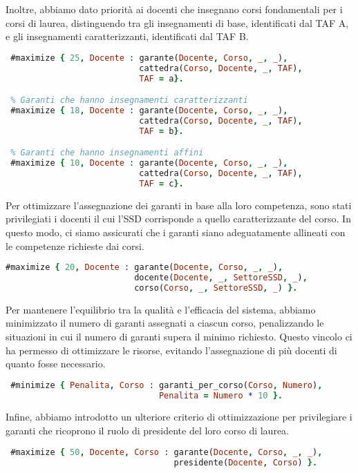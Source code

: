 Inoltre, abbiamo dato priorità ai docenti che insegnano corsi fondamentali per i 
corsi di laurea, distinguendo tra gli insegnamenti di base, identificati dal TAF A, 
e gli insegnamenti caratterizzanti, identificati dal TAF B.

\begin{lstlisting}[language=prolog, caption=Gestione delle priorità del TAF.]
 % Garanti che hanno insegnamenti di base
 #maximize { 25, Docente : garante(Docente, Corso, _, _), 
                           cattedra(Corso, Docente, _, TAF), 
                           TAF = a}.

 % Garanti che hanno insegnamenti caratterizzanti
 #maximize { 18, Docente : garante(Docente, Corso, _, _), 
                           cattedra(Corso, Docente, _, TAF), 
                           TAF = b}.

 % Garanti che hanno insegnamenti affini
 #maximize { 10, Docente : garante(Docente, Corso, _, _), 
                           cattedra(Corso, Docente, _, TAF), 
                           TAF = c}.
\end{lstlisting}

Per ottimizzare l'assegnazione dei garanti in base alla loro competenza, sono stati 
privilegiati i docenti il cui l'SSD corrisponde a quello caratterizzante del corso.
In questo modo, ci siamo assicurati che i garanti siano adeguatamente allineati con 
le competenze richieste dai corsi.

\begin{lstlisting}[language=prolog, caption=Preferenza dei garanti con macrosettore coerente a quello del corso.]
% Ottimizzare i garanti con SSD caratterizzante
#maximize { 20, Docente : garante(Docente, Corso, _, _), 
                          docente(Docente, _, SettoreSSD, _), 
                          corso(Corso, _, SettoreSSD, _) }.
\end{lstlisting}

Per mantenere l'equilibrio tra la qualità e l'efficacia del sistema, abbiamo 
minimizzato il numero di garanti assegnati a ciascun corso, penalizzando le situazioni 
in cui il numero di garanti supera il minimo richiesto. Questo vincolo ci ha permesso 
di ottimizzare le risorse, evitando l'assegnazione di più docenti di quanto fosse necessario.

\begin{lstlisting}[language=prolog, caption=Minimizzazione dei garanti per corso di laurea.]
 % Minimizzo il numero di garanti per ogni corso
 #minimize { Penalita, Corso : garanti_per_corso(Corso, Numero),
                               Penalita = Numero * 10 }.
\end{lstlisting}

Infine, abbiamo introdotto un ulteriore criterio di ottimizzazione per privilegiare i 
garanti che ricoprono il ruolo di presidente del loro corso di laurea. 

\begin{lstlisting}[language=prolog, caption=Massimizzazione dei presidenti come garanti.]
 % Massimizza i presidenti che sono garanti nel loro corso di laurea
 #maximize { 50, Docente, Corso : garante(Docente, Corso, _, _), 
                                  presidente(Docente, Corso) }.
\end{lstlisting}